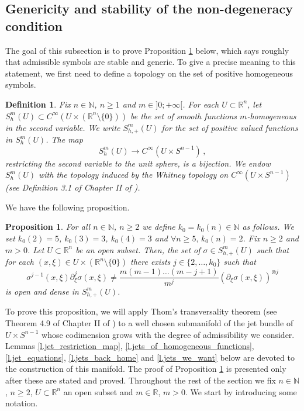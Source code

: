 \documentclass[10pt,twoside]{article}
\newcommand{\R}{\mathbb{R}}
\newcommand{\N}{\mathbb{N}}
\numberwithin{theorem}{section}
\newtheorem{proposition}[theorem]{Proposition}
\newtheorem{definition}[theorem]{Definition}
\begin{document}
\subsection{Genericity and stability of the non-degeneracy condition}\label{ss.whitney}

The goal of this subsection is to prove Proposition \ref{p.fat} below, which says roughly that admissible symbols are stable and generic. To give a precise meaning to this statement, we first need to define a topology on the set of positive homogeneous symbols.

\begin{definition}
Fix $n\in\N$, $n\geq 1$ and $m\in]0;+\infty[$. For each $U\subset\R^n$, let $S^m_h(U)\subset C^\infty(U\times (\R^n\setminus\{0\}))$ be the set of smooth functions $m$-homogeneous in the second variable.  We write $S^m_{h,+}(U)$ for the set of positive valued functions in $S^m_h(U)$. The map
\[
S^m_h(U)\rightarrow C^\infty(U\times S^{n-1})\, ,
\]
restricting the second variable to the unit sphere, is a bijection. We endow $S^m_h(U)$ with the topology induced by the Whitney topology on $C^\infty(U\times S^{n-1})$ (see Definition 3.1 of Chapter II of \cite{gg_stable}).
\end{definition}

We have the following proposition.

\begin{proposition}\label{p.fat}
For all $n\in\N$, $n\geq 2$ we define $k_0=k_0(n)\in\N$ as follows. We set $k_0(2)=5$, $k_0(3)=3$, $k_0(4)=3$ and $\forall n\geq 5,\, k_0(n)=2$. Fix $n\geq 2$ and $m>0$. Let $U\subset\R^n$ be an open subset. Then, the set of $\sigma\in S^m_{h,+}(U)$ such that for each $(x,\xi)\in U\times(\R^n\setminus\{0\})$ there exists $j\in\{2,\dots,k_0\}$ such that
\begin{equation}\label{e.fat}
\sigma^{j-1}(x,\xi)\partial_\xi^j\sigma(x,\xi)\neq \frac{m(m-1)\dots(m-j+1)}{m^j}\left(\partial_\xi\sigma(x,\xi)\right)^{\otimes j}
\end{equation}
 is open and dense in $S^m_{h,+}(U)$.
\end{proposition}

To prove this proposition, we will apply Thom's transversality theorem (see Theorem 4.9 of Chapter II of \cite{gg_stable}) to a well chosen submanifold of the jet bundle of $U\times S^{n-1}$ whose codimension grows with the degree of admissibility we consider. Lemmas \ref{l.jet_restriction_map}, \ref{l.jets_of_homogeneous_functions}, \ref{l.jet_equations}, \ref{l.jets_back_home} and \ref{l.jets_we_want} below are devoted to the construction of this manifold. The proof of Proposition \ref{p.fat} is presented only after these are stated and proved. Throughout the rest of the section we fix $n\in\N$, $n\geq 2$, $U\subset\R^n$ an open subset and $m\in\R$, $m>0$. We start by introducing some notation.
\end{document}
